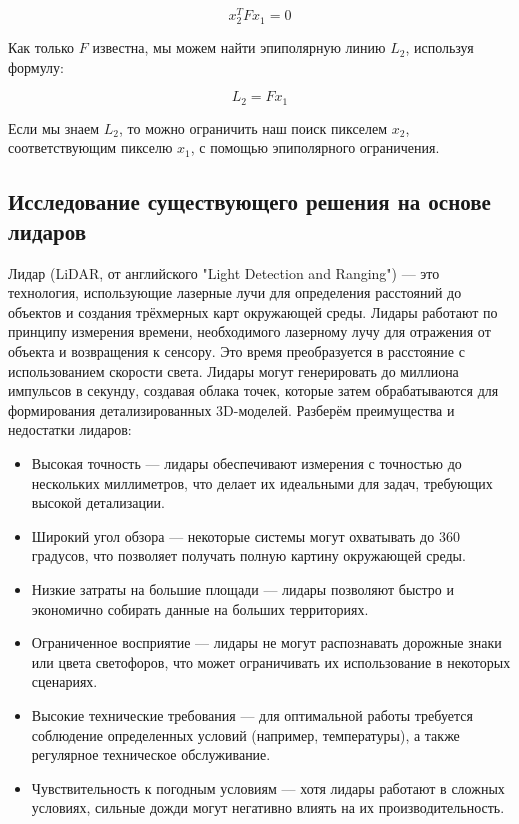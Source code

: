\[x_2^T F x_1 = 0\]

Как только $F$ известна, мы можем найти эпиполярную линию $L_2$, используя формулу:

\[L_2 = F x_1\]

Если мы знаем $L_2$, то можно ограничить наш поиск пикселем $x_2$, соответствующим пикселю $x_1$, с помощью эпиполярного ограничения.




\subsection{Исследование существующего решения на основе лидаров}

Лидар (LiDAR, от английского "Light Detection and Ranging") — это технология, использующие лазерные лучи для определения расстояний до объектов и создания трёхмерных карт окружающей среды. Лидары работают по принципу измерения времени, необходимого лазерному лучу для отражения от объекта и возвращения к сенсору. Это время преобразуется в расстояние с использованием скорости света. Лидары могут генерировать до миллиона импульсов в секунду, создавая облака точек, которые затем обрабатываются для формирования детализированных 3D-моделей. Разберём преимущества и недостатки лидаров:

\begin{itemize}
    \item Высокая точность — лидары обеспечивают измерения с точностью до нескольких миллиметров, что делает их идеальными для задач, требующих высокой детализации.

    \item Широкий угол обзора — некоторые системы могут охватывать до 360 градусов, что позволяет получать полную картину окружающей среды.

    \item Низкие затраты на большие площади — лидары позволяют быстро и экономично собирать данные на больших территориях.

    \item Ограниченное восприятие — лидары не могут распознавать дорожные знаки или цвета светофоров, что может ограничивать их использование в некоторых сценариях.

    \item Высокие технические требования — для оптимальной работы требуется соблюдение определенных условий (например, температуры), а также регулярное техническое обслуживание.

    \item Чувствительность к погодным условиям — хотя лидары работают в сложных условиях, сильные дожди могут негативно влиять на их производительность.
\end{itemize}

